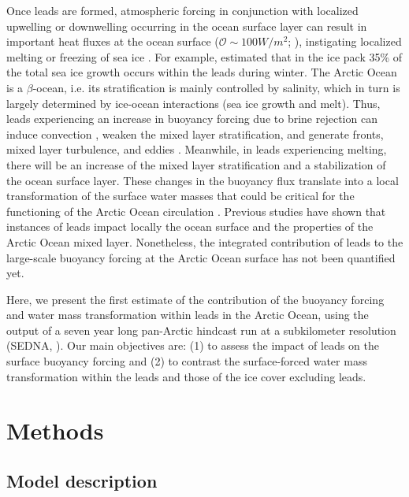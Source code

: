 \documentclass[draft]{agujournal2019}
\begin{document}
Once leads are formed, atmospheric forcing in conjunction with localized upwelling or downwelling occurring in the ocean surface layer can result in important heat fluxes at the ocean surface ($\mathcal{O} \sim 100 W/m^2$; ), instigating localized melting or freezing of sea ice \cite{Albedyll_thickness_dis_2022}. For example,  estimated that in the ice pack 35\% of the total sea ice growth occurs within the leads during winter. The Arctic Ocean is a $\beta$-ocean, i.e. its stratification is mainly controlled by salinity, which in turn is largely determined by ice-ocean interactions (sea ice growth and melt). Thus, leads experiencing an increase in buoyancy forcing due to brine rejection can induce convection \cite{Smith_convection_1998}, weaken the mixed layer stratification, and generate fronts, mixed layer turbulence, and eddies \cite{Reiser_LKF_2020, Smith_generation_2002}. Meanwhile, in leads experiencing melting, there will be an increase of the mixed layer stratification and a stabilization of the ocean surface layer. These changes in the buoyancy flux translate into a local transformation of the surface water masses that could be critical for the functioning of the Arctic Ocean circulation \cite{Lenn_mixing_2022, Pemberton_WMT_2015, Smith_polynyas_1990}. 
Previous studies have shown that instances of leads impact locally the ocean surface and the properties of the Arctic Ocean mixed layer. Nonetheless, the integrated contribution of leads to the large-scale buoyancy forcing at the Arctic Ocean surface has not been quantified yet.

Here, we present the first estimate of the contribution of the buoyancy forcing and water mass transformation within leads in the Arctic Ocean, using the output of a seven year long pan-Arctic hindcast run at a subkilometer resolution (SEDNA, ). Our main objectives are: (1) to assess the impact of leads on the surface buoyancy forcing and (2) to contrast the surface-forced water mass transformation within the leads and those of the ice cover excluding leads.

\section{Methods}
\subsection{Model description}
\end{document}
